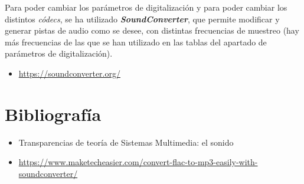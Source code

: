 \documentclass[11pt,a4paper]{article}
\begin{document}
Para poder cambiar los parámetros de digitalización y para poder cambiar los distintos \textit{códecs}, se ha utilizado \textbf{\textit{SoundConverter}}, que permite modificar y generar pistas de audio como se desee, con distintas frecuencias de muestreo (hay más frecuencias de las que se han utilizado en las tablas del apartado de parámetros de digitalización).\\

\begin{itemize}
	\item \textcolor{blue}{\url{https://soundconverter.org/}}
\end{itemize}

\section{Bibliografía}

\begin{itemize}
	\item Transparencias de teoría de Sistemas Multimedia: el sonido
	\item \footnotesize{\textcolor{blue}{\url{https://www.maketecheasier.com/convert-flac-to-mp3-easily-with-soundconverter/}}}
\end{itemize}
\end{document}
